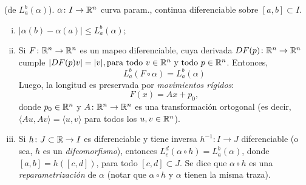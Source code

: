 \begin{property}
	(de $L_{a}^{b}(\alpha)$). $\alpha \colon I \to \mathbb{R}^{n}$ curva param., continua diferenciable sobre $[a,b] \subset I$.
	\begin{enumerate}[(i)]
		\item $|\alpha(b) - \alpha(a)| \leq L_{a}^{b}(\alpha)$;

		\item Si $F \colon \mathbb{R}^{n} \to \mathbb{R}^{n}$ es un mapeo diferenciable, cuya derivada $DF(p) \colon \mathbb{R}^{n} \to \mathbb{R}^{n}$ cumple $|DF(p) v| = |v|, \text{para todo } v \in \mathbb{R}^{n} \text{ y todo } p \in \mathbb{R}^{n}$. Entonces,
		\[ L_{a}^{b}(F \circ \alpha) = L_{a}^{b}(\alpha) \]
		Luego, la longitud es preservada por \textit{movimientos rígidos}:
		\[ F(x) = Ax + p_{0}, \]
		donde $p_{0} \in \mathbb{R}^{n}$ y $A \colon \mathbb{R}^{n} \to \mathbb{R}^{n}$ es una transformación ortogonal (es decir, $\langle Au, Av \rangle = \langle u, v \rangle$ para todos los $u,v \in \mathbb{R}^{n}$). 

		\item Si $h \colon J \subset \mathbb{R} \to I$ es diferenciable y tiene inversa $h^{-1} \colon I \to J$ diferenciable (o sea, $h$ es un \textit{difeomorfismo}), entonces $L_{c}^{d}(\alpha \circ h) = L_{a}^{b}(\alpha)$, donde $[a,b] = h([c,d])$, para todo $[c,d] \subset J$. Se dice que $\alpha \circ h$ es una \textit{reparametrización} de $\alpha$ (notar que $\alpha \circ h$ y $\alpha$ tienen la misma traza).
	\end{enumerate}
\end{property}
